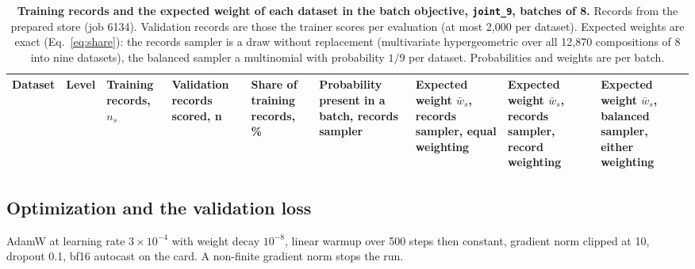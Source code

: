 \begin{table}[htbp]
\centering
\footnotesize
\setlength{\tabcolsep}{3pt}
\caption[]{\textbf{Training records and the expected weight of each dataset in
the batch objective, \texttt{joint\_9}, batches of 8.} Records from the prepared store (job
6134). Validation records are those the trainer scores per evaluation (at most 2{,}000 per
dataset). Expected weights are exact (Eq.~\ref{eq:share}): the records sampler is a draw
without replacement (multivariate hypergeometric over all 12{,}870 compositions of 8 into
nine datasets), the balanced sampler a multinomial with probability $1/9$ per dataset.
Probabilities and weights are per batch.}
\label{tab:share}
\begin{tabular}{>{\raggedright\arraybackslash}p{26mm}>{\raggedright\arraybackslash}p{9mm}>{\raggedleft\arraybackslash}p{14mm}>{\raggedleft\arraybackslash}p{19mm}>{\raggedleft\arraybackslash}p{15mm}>{\raggedleft\arraybackslash}p{18mm}>{\raggedleft\arraybackslash}p{19mm}>{\raggedleft\arraybackslash}p{19mm}>{\raggedleft\arraybackslash}p{19mm}}
\toprule
Dataset & Level & Training records, $n_s$ & Validation records scored, n & Share of training records, \% & Probability present in a batch, records sampler & Expected weight $\bar w_s$, records sampler, equal weighting & Expected weight $\bar w_s$, records sampler, record weighting & Expected weight $\bar w_s$, balanced sampler, either weighting \\
\midrule

\end{tabular}
\end{table}

\subsection{Optimization and the validation loss}
\label{sec:optim}

AdamW at learning rate $3 \times 10^{-4}$ with weight decay $10^{-8}$, linear warmup over
500 steps then constant, gradient norm clipped at 10, dropout 0.1, bf16 autocast on the
card. A non-finite gradient norm stops the run.

